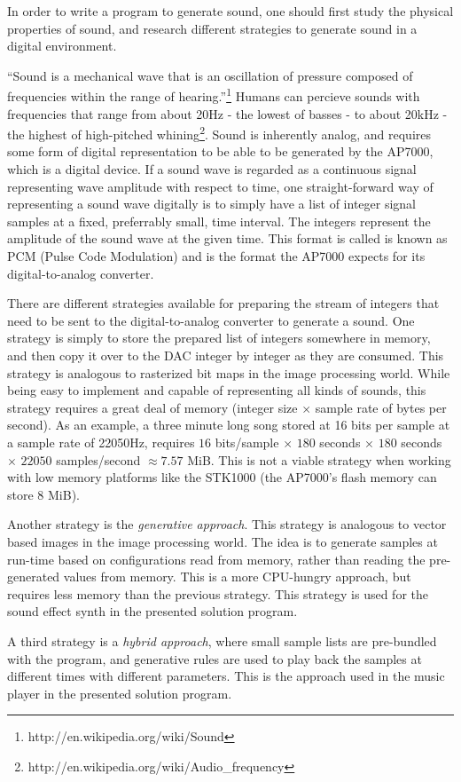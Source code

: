 In order to write a program to generate sound, one should first study the physical properties of sound, and research different strategies to generate sound in a digital environment.

``Sound is a mechanical wave that is an oscillation of pressure composed of frequencies within the range of hearing.''\footnote{http://en.wikipedia.org/wiki/Sound} Humans can percieve sounds with frequencies that range from about 20Hz - the lowest of basses - to about 20kHz - the highest of high-pitched whining\footnote{http://en.wikipedia.org/wiki/Audio_frequency}.
Sound is inherently analog, and requires some form of digital representation to be able to be generated by the AP7000, which is a digital device.
If a sound wave is regarded as a continuous signal representing wave amplitude with respect to time, one straight-forward way of representing a sound wave digitally is to simply have a list of integer signal samples at a fixed, preferrably small, time interval.
The integers represent the amplitude of the sound wave at the given time.
This format is called is known as PCM (Pulse Code Modulation) and is the format the AP7000 expects for its digital-to-analog converter.

There are different strategies available for preparing the stream of integers that need to be sent to the digital-to-analog converter to generate a sound.
One strategy is simply to store the prepared list of integers somewhere in memory, and then copy it over to the DAC integer by integer as they are consumed.
This strategy is analogous to rasterized bit maps in the image processing world.
While being easy to implement and capable of representing all kinds of sounds, this strategy requires a great deal of memory (integer size $\times$ sample rate of bytes per second).
As an example, a three minute long song stored at 16 bits per sample at a sample rate of 22050Hz, requires $16$ bits/sample $\times$ $180$ seconds $\times$ $180$ seconds $\times$ $22050$ samples/second $\approx 7.57$ MiB.
This is not a viable strategy when working with low memory platforms like the STK1000 (the AP7000's flash memory can store 8 MiB).

Another strategy is the \emph{generative approach}.
This strategy is analogous to vector based images in the image processing world.
The idea is to generate samples at run-time based on configurations read from memory, rather than reading the pre-generated values from memory.
This is a more CPU-hungry approach, but requires less memory than the previous strategy.
This strategy is used for the sound effect synth in the presented solution program.

A third strategy is a \emph{hybrid approach}, where small sample lists are pre-bundled with the program, and generative rules are used to play back the samples at different times with different parameters.
This is the approach used in the music player in the presented solution program.
